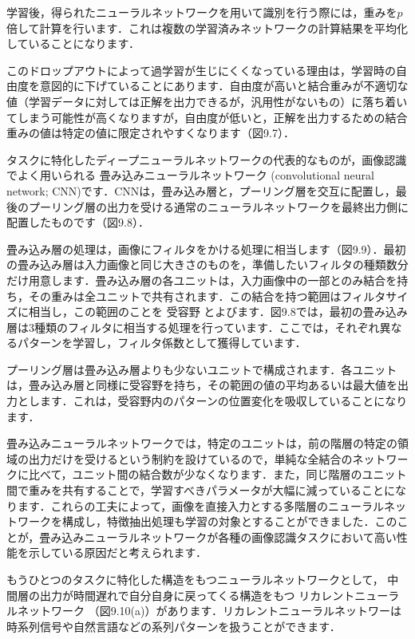 学習後，得られたニューラルネットワークを用いて識別を行う際には，重みを$p$倍して計算を行います．これは複数の学習済みネットワークの計算結果を平均化していることになります．

このドロップアウトによって過学習が生じにくくなっている理由は，学習時の自由度を意図的に下げていることにあります．自由度が高いと結合重みが不適切な値（学習データに対しては正解を出力できるが，汎用性がないもの）に落ち着いてしまう可能性が高くなりますが，自由度が低いと，正解を出力するための結合重みの値は特定の値に限定されやすくなります（図9.7）．


タスクに特化したディープニューラルネットワークの代表的なものが，画像認識でよく用いられる
畳み込みニューラルネットワーク
(convolutional neural network; CNN)です．CNNは，畳み込み層と，プーリング層を交互に配置し，最後のプーリング層の出力を受ける通常のニューラルネットワークを最終出力側に配置したものです（図9.8）．


畳み込み層の処理は，画像にフィルタをかける処理に相当します（図9.9）．最初の畳み込み層は入力画像と同じ大きさのものを，準備したいフィルタの種類数分だけ用意します．畳み込み層の各ユニットは，入力画像中の一部とのみ結合を持ち，その重みは全ユニットで共有されます．この結合を持つ範囲はフィルタサイズに相当し，この範囲のことを
受容野
とよびます．図9.8では，最初の畳み込み層は3種類のフィルタに相当する処理を行っています．ここでは，それぞれ異なるパターンを学習し，フィルタ係数として獲得しています．

プーリング層は畳み込み層よりも少ないユニットで構成されます．各ユニットは，畳み込み層と同様に受容野を持ち，その範囲の値の平均あるいは最大値を出力とします．これは，受容野内のパターンの位置変化を吸収していることになります．

畳み込みニューラルネットワークでは，特定のユニットは，前の階層の特定の領域の出力だけを受けるという制約を設けているので，単純な全結合のネットワークに比べて，ユニット間の結合数が少なくなります．また，同じ階層のユニット間で重みを共有することで，学習すべきパラメータが大幅に減っていることになります．これらの工夫によって，画像を直接入力とする多階層のニューラルネットワークを構成し，特徴抽出処理も学習の対象とすることができました．このことが，畳み込みニューラルネットワークが各種の画像認識タスクにおいて高い性能を示している原因だと考えられます．


もうひとつのタスクに特化した構造をもつニューラルネットワークとして，
中間層の出力が時間遅れで自分自身に戻ってくる構造をもつ
リカレントニューラルネットワーク
（図9.10(a)）があります．リカレントニューラルネットワーは時系列信号や自然言語などの系列パターンを扱うことができます．

